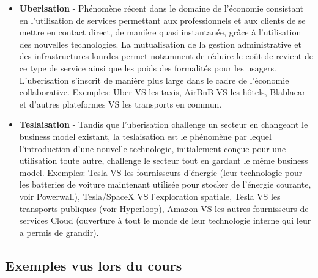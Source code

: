 \begin{itemize}
    \item \textbf{Uberisation} - Phénomène récent dans le domaine de l'économie consistant en l'utilisation de services permettant aux professionnels et aux clients de se mettre en contact direct, de manière quasi instantanée, grâce à l'utilisation des nouvelles technologies. La mutualisation de la gestion administrative et des infrastructures lourdes permet notamment de réduire le coût de revient de ce type de service ainsi que les poids des formalités pour les usagers. L'uberisation s'inscrit de manière plus large dans le cadre de l'économie collaborative. Exemples: Uber VS les taxis, AirBnB VS les hôtels, Blablacar et d'autres plateformes VS les transports en commun.
    \item \textbf{Teslaisation} - Tandis que l'uberisation challenge un secteur en changeant le business model existant, la teslaisation est le phénomène par lequel l'introduction d'une nouvelle technologie, initialement conçue pour une utilisation toute autre, challenge le secteur tout en gardant le même business model. Exemples: Tesla VS les fournisseurs d'énergie (leur technologie pour les batteries de voiture maintenant utilisée pour stocker de l'énergie courante, voir Powerwall), Tesla/SpaceX VS l'exploration spatiale, Tesla VS les transports publiques (voir Hyperloop), Amazon VS les autres fournisseurs de services Cloud (ouverture à tout le monde de leur technologie interne qui leur a permis de grandir).
\end{itemize}

\subsection{Exemples vus lors du cours}

